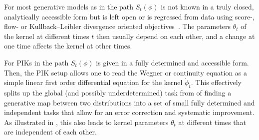 \documentclass[reprint,amsmath,amssymb,aps,pra,superscriptaddress,nofootinbib,twocolumn,floatfix,nolongbibliography]{revtex4-2}
\begin{document}
For most generative models as in  the path $S_t(\phi)$ is not known in a truly closed, analytically accessible form but is left open or is regressed from data using score-, flow- or Kullback--Leibler divergence oriented objectives~\cite{Liu:2016svg,Rezende:2016vinf,Dinh:2017nfd,Albergo:2019eim,Nicoli:2020njz,Ho:2020ddpm,Song:2021sbgm,Wang:2023exq,Lipman:2023fmgm,Xu:2024jko}. The parameters $\theta_t$ of the kernel at different times $t$ then usually depend on each other, and a change at one time affects the kernel at other times.

For PIKs in  the path $S_t(\phi)$ is given in a fully determined and accessible form. Then, the PIK setup allows one to read the Wegner or continuity equation  as a simple linear first order differential equation for the kernel $\dot{\phi}_t$. This effectively splits up the global (and possibly underdetermined) task from  of finding a generative map between two distributions into a set of small fully determined and independent tasks that allow for an error correction and systematic improvement. As illustrated in , this also leads to kernel parameters $\theta_t$ at different times that are independent of each other.
\end{document}
